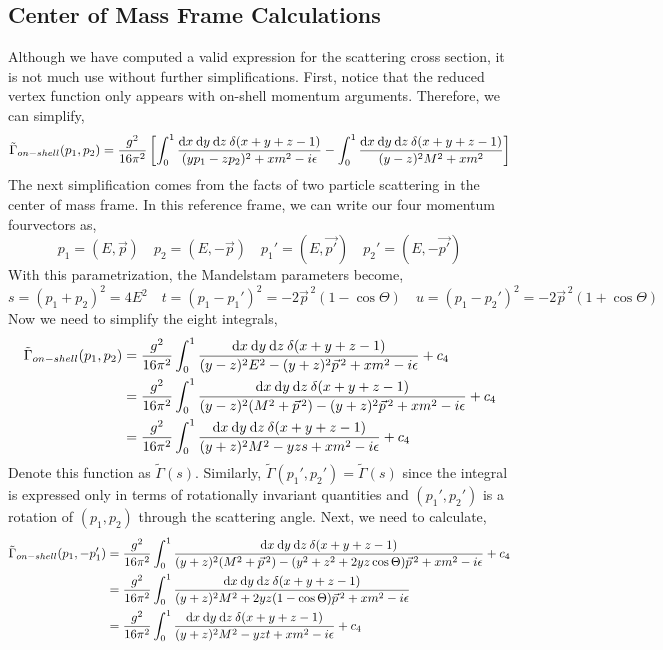 \documentclass{article}
\begin{document}
\subsection{Center of Mass Frame Calculations}

Although we have computed a valid expression for the scattering cross section, it is not much use without further simplifications. First, notice that the reduced vertex function only appears with on-shell momentum arguments. Therefore, we can simplify,
\[\tilde{\Gamma}_{on-shell}(p_1, p_2) = \frac{ g^2}{16 \pi^2} \left[ \int_0^1 \frac{\mathrm{d}x \: \mathrm{d}y \: \mathrm{d}z \: \delta(x + y + z - 1)}{(y p_1 - z p_2)^2 + x m^2 - i \epsilon} - \int_0^1 \frac{\mathrm{d}x \: \mathrm{d}y \: \mathrm{d}z \: \delta(x + y + z - 1)}{(y - z)^2 M^2 + x m^2} \right]\]
The next simplification comes from the facts of two particle scattering in the center of mass frame. In this reference frame, we can write our four momentum fourvectors as,
\[ p_1 = (E, \vec{p}) \quad p_2 = (E, -\vec{p}) \quad p_1' = (E, \vec{p'}) \quad p_2' = (E, -\vec{p'}) \]
With this parametrization, the Mandelstam parameters become,
\[ s = (p_1 + p_2)^2 = 4 E^2 \quad t = (p_1 - p_1')^2 = -2 \vec{p}^{\, 2} (1 - \cos{\Theta}) \quad u = (p_1 - p_2')^2 = -2 \vec{p}^{\, 2} (1 + \cos{\Theta}) \]
Now we need to simplify the eight integrals,
\begin{align*} 
\tilde{\Gamma}_{on-shell}(p_1, p_2) &= \frac{g^2}{16 \pi^2} \int_0^1 \frac{\mathrm{d}x \: \mathrm{d}y \: \mathrm{d}z \: \delta(x + y + z - 1)}{(y - z)^2 E^2 - (y + z)^2 \vec{p}^{\, 2} + x m^2 - i \epsilon} + c_4
\\
& = \frac{g^2}{16 \pi^2} \int_0^1 \frac{\mathrm{d}x \: \mathrm{d}y \: \mathrm{d}z \: \delta(x + y + z - 1) }{(y - z)^2 (M^2 + \vec{p}^{\, 2}) - (y + z)^2 \vec{p}^{\, 2} + x m^2 - i \epsilon} + c_4
\\
& = \frac{g^2}{16 \pi^2} \int_0^1 \frac{ \mathrm{d}x \: \mathrm{d}y \: \mathrm{d}z \: \delta(x + y + z - 1) }{(y + z)^2 M^2 - yz s + x m^2 - i \epsilon} + c_4
\end{align*}
Denote this function as $\tilde{\Gamma}(s)$.
Similarly, $\tilde{\Gamma}(p_1', p_2') = \tilde{\Gamma}(s)$ since the integral is expressed only in terms of rotationally invariant quantities and $(p_1', p_2')$ is a rotation of $(p_1, p_2)$ through the scattering angle.
Next, we need to calculate, 
\begin{align*} 
\tilde{\Gamma}_{on-shell}(p_1, -p_1') &= \frac{g^2}{16 \pi^2} \int_0^1 \frac{\mathrm{d}x \: \mathrm{d}y \: \mathrm{d}z \: \delta(x + y + z - 1)}{(y + z)^2 (M^2 + \vec{p}^{\, 2}) - (y^2 + z^2 + 2 yz \cos{\Theta}) \vec{p}^{\, 2}+ x m^2 - i \epsilon} + c_4 
\\
& = \frac{g^2}{16 \pi^2} \int_0^1 \frac{\mathrm{d}x \: \mathrm{d}y \: \mathrm{d}z \: \delta(x + y + z - 1)}{(y + z)^2 M^2 + 2yz(1 - \cos{\Theta})\vec{p}^{\, 2} + x m^2 - i \epsilon}
\\
& = \frac{g^2}{16 \pi^2} \int_0^1 \frac{\mathrm{d}x \: \mathrm{d}y \: \mathrm{d}z \: \delta(x + y + z - 1) }{(y + z)^2M^2 - yz t + x m^2 - i \epsilon} + c_4
\end{align*}
\end{document}
